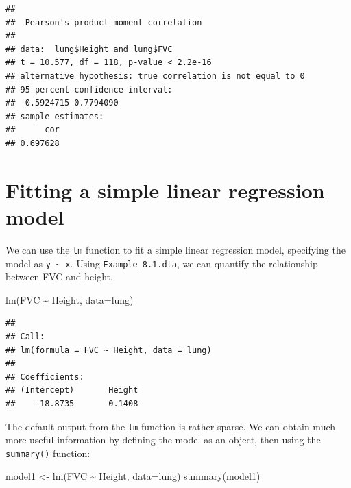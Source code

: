 \documentclass[
]{memoir}
\newenvironment{Shaded}{\begin{snugshade}}{\end{snugshade}}
\newcommand{\AttributeTok}[1]{\textcolor[rgb]{0.77,0.63,0.00}{#1}}
\newcommand{\FunctionTok}[1]{\textcolor[rgb]{0.00,0.00,0.00}{#1}}
\newcommand{\NormalTok}[1]{#1}
\newcommand{\OtherTok}[1]{\textcolor[rgb]{0.56,0.35,0.01}{#1}}
\newcommand{\SpecialCharTok}[1]{\textcolor[rgb]{0.00,0.00,0.00}{#1}}
\begin{document}
\begin{Shaded}
\end{Shaded}

\begin{verbatim}
## 
##  Pearson's product-moment correlation
## 
## data:  lung$Height and lung$FVC
## t = 10.577, df = 118, p-value < 2.2e-16
## alternative hypothesis: true correlation is not equal to 0
## 95 percent confidence interval:
##  0.5924715 0.7794090
## sample estimates:
##      cor 
## 0.697628
\end{verbatim}

\hypertarget{fitting-a-simple-linear-regression-model}{%
\section{Fitting a simple linear regression model}\label{fitting-a-simple-linear-regression-model}}

We can use the \texttt{lm} function to fit a simple linear regression model, specifying the model as \texttt{y\ \textasciitilde{}\ x}. Using \texttt{Example\_8.1.dta}, we can quantify the relationship between FVC and height.

\begin{Shaded}
\begin{Highlighting}[]
\FunctionTok{lm}\NormalTok{(FVC }\SpecialCharTok{\textasciitilde{}}\NormalTok{ Height, }\AttributeTok{data=}\NormalTok{lung)}
\end{Highlighting}
\end{Shaded}

\begin{verbatim}
## 
## Call:
## lm(formula = FVC ~ Height, data = lung)
## 
## Coefficients:
## (Intercept)       Height  
##    -18.8735       0.1408
\end{verbatim}

The default output from the \texttt{lm} function is rather sparse. We can obtain much more useful information by defining the model as an object, then using the \texttt{summary()} function:

\begin{Shaded}
\begin{Highlighting}[]
\NormalTok{model1 }\OtherTok{\textless{}{-}} \FunctionTok{lm}\NormalTok{(FVC }\SpecialCharTok{\textasciitilde{}}\NormalTok{ Height, }\AttributeTok{data=}\NormalTok{lung)}
\FunctionTok{summary}\NormalTok{(model1)}
\end{Highlighting}
\end{Shaded}
\end{document}
